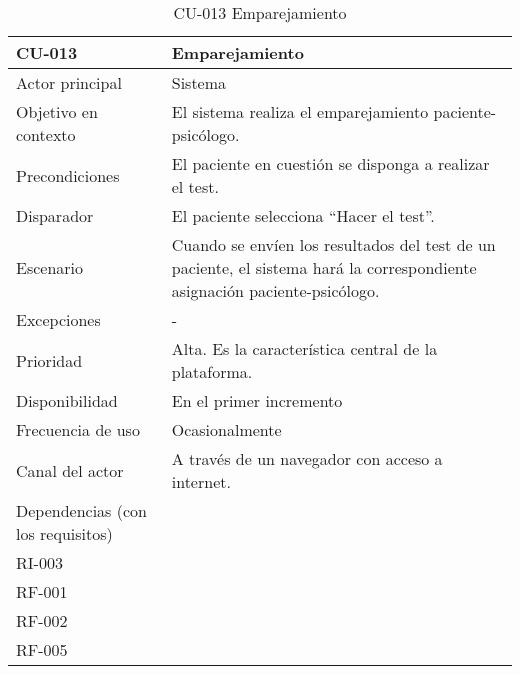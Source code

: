 %
%

\begin{table}[htbp]
\centering
\caption{CU-013 Emparejamiento}                        
\begin{tabularx}{\textwidth}{|X|X|}
\hline
CU-013                            & Emparejamiento                                                                                                             \\ \hline
Actor principal                   & Sistema                                                                                                                    \\ \hline
Objetivo en contexto              & El sistema realiza el emparejamiento paciente-psicólogo.                                                                   \\ \hline
Precondiciones                    & El paciente en cuestión se disponga a realizar el test.                                                                    \\ \hline
Disparador                        & El paciente selecciona “Hacer el test”.                                                                                    \\ \hline
Escenario                         & Cuando se envíen los resultados del test de un paciente, el sistema hará la correspondiente asignación paciente-psicólogo. \\ \hline
Excepciones                       & -                                                                                                                          \\ \hline
Prioridad                         & Alta. Es la característica central de la plataforma.                                                                       \\ \hline
Disponibilidad                    & En el primer incremento                                                                                                    \\ \hline
Frecuencia de uso                 & Ocasionalmente                                                                                                             \\ \hline
Canal del actor                   & A través de un navegador con acceso a internet.                                                                            \\ \hline
Dependencias (con los requisitos) & \begin{tabular}[c]{@{}l@{}}RI-001\\ RI-003\\ RF-001\\ RF-002\\  RF-005\end{tabular}                                                  \\ \hline
\end{tabularx}
\end{table}

